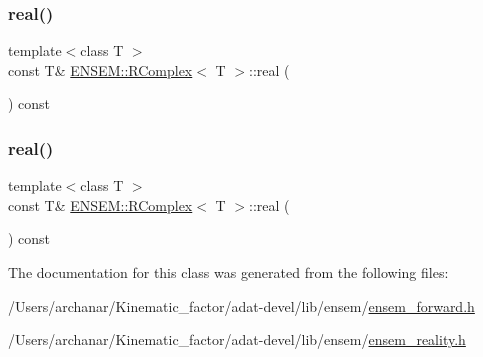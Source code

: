 \mbox{\label{classENSEM_1_1RComplex_a0a055b8b16ef4c73ab5fb4e5ff93c7f1}} 
\subsubsection{\texorpdfstring{real()}{real()}\hspace{0.1cm}{\footnotesize\ttfamily [5/6]}}
{\footnotesize\ttfamily template$<$class T $>$ \\
const T\& \mbox{\hyperlink{classENSEM_1_1RComplex}{E\+N\+S\+E\+M\+::\+R\+Complex}}$<$ T $>$\+::real (\begin{DoxyParamCaption}{ }\end{DoxyParamCaption}) const\hspace{0.3cm}{\ttfamily [inline]}}

\mbox{\label{classENSEM_1_1RComplex_a0a055b8b16ef4c73ab5fb4e5ff93c7f1}} 
\subsubsection{\texorpdfstring{real()}{real()}\hspace{0.1cm}{\footnotesize\ttfamily [6/6]}}
{\footnotesize\ttfamily template$<$class T $>$ \\
const T\& \mbox{\hyperlink{classENSEM_1_1RComplex}{E\+N\+S\+E\+M\+::\+R\+Complex}}$<$ T $>$\+::real (\begin{DoxyParamCaption}{ }\end{DoxyParamCaption}) const\hspace{0.3cm}{\ttfamily [inline]}}



The documentation for this class was generated from the following files\+:\begin{DoxyCompactItemize}
\item 
/\+Users/archanar/\+Kinematic\+\_\+factor/adat-\/devel/lib/ensem/\mbox{\hyperlink{adat-devel_2lib_2ensem_2ensem__forward_8h}{ensem\+\_\+forward.\+h}}\item 
/\+Users/archanar/\+Kinematic\+\_\+factor/adat-\/devel/lib/ensem/\mbox{\hyperlink{adat-devel_2lib_2ensem_2ensem__reality_8h}{ensem\+\_\+reality.\+h}}\end{DoxyCompactItemize}
